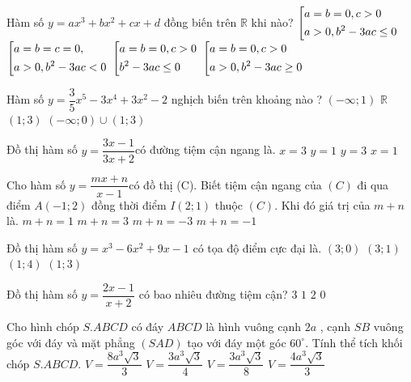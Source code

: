 \begin{ex}%
Hàm số $y=ax^3+bx^2+cx+d$ đồng biến trên $\mathbb{R}$ khi nào?
\choice
{\True $\left[\begin{aligned}&a=b=0, c>0\\&a>0,b^2-3ac\leq 0\end{aligned}\right.$}
{$\left[\begin{aligned}&a=b=c=0,\\&a>0,b^2-3ac<0\end{aligned}\right.$}
{$\left[\begin{aligned}&a=b=0, c>0\\ &b^2-3ac\leq 0\end{aligned}\right.$}
{$\left[\begin{aligned}&a=b=0, c>0\\&a>0,b^2-3ac\geq 0\end{aligned}\right.$}
\end{ex} 
\begin{ex}%
Hàm số $y=\dfrac{3}{5}x^5-3x^4+3x^2-2$ nghịch biến trên khoảng nào ?
\choice
{$(-\infty;1)$}
{$\mathbb{R}$}
{\True $(1;3)$}
{$(-\infty;0)\cup(1;3)$}
\end{ex} 
\begin{ex}%
Đồ thị hàm số $y=\dfrac{3x-1}{3x+2}$có đường tiệm cận ngang là.
\choice
{$x=3$}
{\True $y=1$}
{$y=3$}
{$x=1$}
\end{ex}
\begin{ex}%
Cho hàm số $y=\dfrac{mx+n}{x-1}$có đồ thị (C). Biết tiệm cận ngang của $(C)$ đi qua điểm $A(-1;2)$
đồng thời điểm $I(2;1)$ thuộc $(C)$. Khi đó giá trị của $m+n$ là.
\choice
{$m+n=1$}
{$m+n=3$}
{$m+n=-3$}
{\True $m+n=-1$}
\end{ex}
\begin{ex}%
Đồ thị hàm số $y=x^3-6x^2+9x-1$ có tọa độ điểm cực đại là.
\choice
{$(3;0)$}
{$(3;1)$}
{$(1;4)$}
{\True $(1;3)$}
\end{ex}
\begin{ex}%
Đồ thị hàm số $y=\dfrac{2x-1}{x+2}$ có bao nhiêu đường tiệm cận?
\choice
{$3$}
{$1$}
{\True $2$}
{$0$}
\end{ex}
\begin{ex}%
Cho hình chóp $S.ABCD$
có đáy $ABCD$ là hình vuông cạnh $2a$ , cạnh $SB$ vuông góc với đáy
và mặt phẳng $(SAD)$ tạo với đáy một góc $60^{\circ}.$ Tính thể tích khối chóp $S.ABCD$.
\choice
{\True $V=\dfrac{8a^3\sqrt{3}}{3}$}
{$V=\dfrac{3a^3\sqrt{3}}{4}$}
{$V=\dfrac{3a^3\sqrt{3}}{8}$}
{$V=\dfrac{4a^3\sqrt{3}}{3}$}
\end{ex}

